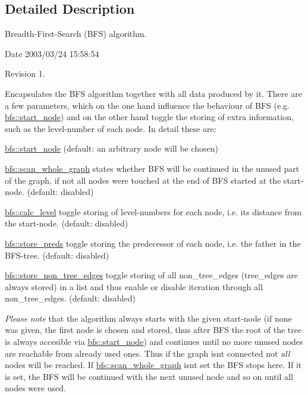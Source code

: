 \subsection{Detailed Description}
Breadth-\/\+First-\/\+Search (B\+FS) algorithm. 

\begin{DoxyParagraph}{Date}
2003/03/24 15\+:58\+:54 
\end{DoxyParagraph}
\begin{DoxyParagraph}{Revision}
1. 
\end{DoxyParagraph}


Encapsulates the B\+FS algorithm together with all data produced by it. There are a few parameters, which on the one hand influence the behaviour of B\+FS (e.\+g. \mbox{\hyperlink{classbfs_a23e2981c2ee617a6e12a8833d2db6210}{bfs\+::start\+\_\+node}}) and on the other hand toggle the storing of extra information, such as the level-\/number of each node. In detail these are\+:
\begin{DoxyItemize}
\item \mbox{\hyperlink{classbfs_a23e2981c2ee617a6e12a8833d2db6210}{bfs\+::start\+\_\+node}} (default\+: an arbitrary node will be chosen)
\item \mbox{\hyperlink{classbfs_a25fc51b1bfbbdd3afefe0a84c1bd2f6b}{bfs\+::scan\+\_\+whole\+\_\+graph}} states whether B\+FS will be continued in the unused part of the graph, if not all nodes were touched at the end of B\+FS started at the start-\/node. (default\+: disabled)
\item \mbox{\hyperlink{classbfs_a491515da4eb8efca0be4fef0df350a8e}{bfs\+::calc\+\_\+level}} toggle storing of level-\/numbers for each node, i.\+e. its distance from the start-\/node. (default\+: disabled)
\item \mbox{\hyperlink{classbfs_a8c7ce0ea2cd8e1932d1da5693d90cf61}{bfs\+::store\+\_\+preds}} toggle storing the predecessor of each node, i.\+e. the father in the B\+F\+S-\/tree. (default\+: disabled)
\item \mbox{\hyperlink{classbfs_a7de47b820fb9532f497660f767c9457f}{bfs\+::store\+\_\+non\+\_\+tree\+\_\+edges}} toggle storing of all non\+\_\+tree\+\_\+edges (tree\+\_\+edges are always stored) in a list and thus enable or disable iteration through all non\+\_\+tree\+\_\+edges. (default\+: disabled)
\end{DoxyItemize}

{\itshape Please} {\itshape note} that the algorithm always starts with the given start-\/node (if none was given, the first node is chosen and stored, thus after B\+FS the root of the tree is always accesible via \mbox{\hyperlink{classbfs_a23e2981c2ee617a6e12a8833d2db6210}{bfs\+::start\+\_\+node}}) and continues until no more unused nodes are reachable from already used ones. Thus if the graph isn\textquotesingle{}t connected not {\itshape all} nodes will be reached. If \mbox{\hyperlink{classbfs_a25fc51b1bfbbdd3afefe0a84c1bd2f6b}{bfs\+::scan\+\_\+whole\+\_\+graph}} isn\textquotesingle{}t set the B\+FS stops here. If it is set, the B\+FS will be continued with the next unused node and so on until all nodes were used.

